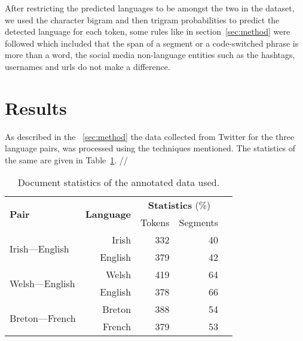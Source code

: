\documentclass[11pt]{article}
\begin{document}
After restricting the predicted languages to be amongst the two in the dataset, we used the character bigram and then trigram probabilities to predict the detected language for each token, some rules like in section~\ref{sec:method} were followed which included that the span of a segment or a code-switched phrase is more than a word, the social media non-language entities such as the hashtags, usernames and urls do not make a difference. 

\section{Results}
\label{sec:results}
As described in the ~\ref{sec:method} the data collected from Twitter for the three language pairs, was processed using the techniques mentioned. The statistics of the same are given in Table~\ref{table:datastats}. // 

\begin{table}
\begin{center}
\begin{tabular}{|l|r|r|r|r}
\hline
\multirow{2}{*}{\textbf{Pair}} & \multirow{2}{*}{\textbf{Language}}  & \multicolumn{2}{c|}{\textbf{Statistics} (\%)} \\\cline{3-4}
                &  &  Tokens & Segments \\
\hline
\multirow{2}{*}{Irish---English} & Irish & 332 & 40 \\
                                 & English & 379 & 42 \\
\hline
\multirow{2}{*}{Welsh---English} & Welsh & 419 & 64 \\
                                 & English & 378 & 66  \\
\hline
\multirow{2}{*}{Breton---French} & Breton & 388 & 54 \\
                                 & French & 379 & 53  \\
\hline
\end{tabular}
\end{center}
\caption{Document statistics of the annotated data used. }
\label{table:datastats}
\end{table}
\end{document}
